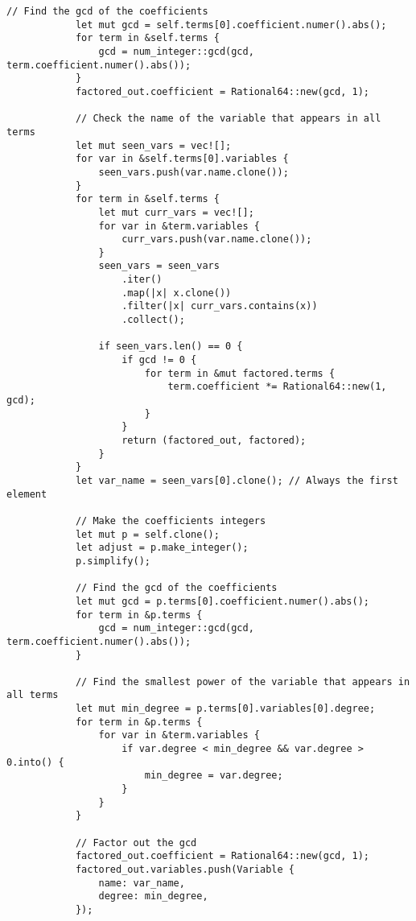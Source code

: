 {\begin{lstlisting}[caption={The implementation of the \texttt{factor()} method for the \texttt{Polynomial} struct}, label={lst:polynomial-factor}]
            // Find the gcd of the coefficients
            let mut gcd = self.terms[0].coefficient.numer().abs();
            for term in &self.terms {
                gcd = num_integer::gcd(gcd, term.coefficient.numer().abs());
            }
            factored_out.coefficient = Rational64::new(gcd, 1);

            // Check the name of the variable that appears in all terms
            let mut seen_vars = vec![];
            for var in &self.terms[0].variables {
                seen_vars.push(var.name.clone());
            }
            for term in &self.terms {
                let mut curr_vars = vec![];
                for var in &term.variables {
                    curr_vars.push(var.name.clone());
                }
                seen_vars = seen_vars
                    .iter()
                    .map(|x| x.clone())
                    .filter(|x| curr_vars.contains(x))
                    .collect();

                if seen_vars.len() == 0 {
                    if gcd != 0 {
                        for term in &mut factored.terms {
                            term.coefficient *= Rational64::new(1, gcd);
                        }
                    }
                    return (factored_out, factored);
                }
            }
            let var_name = seen_vars[0].clone(); // Always the first element

            // Make the coefficients integers
            let mut p = self.clone();
            let adjust = p.make_integer();
            p.simplify();

            // Find the gcd of the coefficients
            let mut gcd = p.terms[0].coefficient.numer().abs();
            for term in &p.terms {
                gcd = num_integer::gcd(gcd, term.coefficient.numer().abs());
            }

            // Find the smallest power of the variable that appears in all terms
            let mut min_degree = p.terms[0].variables[0].degree;
            for term in &p.terms {
                for var in &term.variables {
                    if var.degree < min_degree && var.degree > 0.into() {
                        min_degree = var.degree;
                    }
                }
            }

            // Factor out the gcd
            factored_out.coefficient = Rational64::new(gcd, 1);
            factored_out.variables.push(Variable {
                name: var_name,
                degree: min_degree,
            });


\end{lstlisting}}
